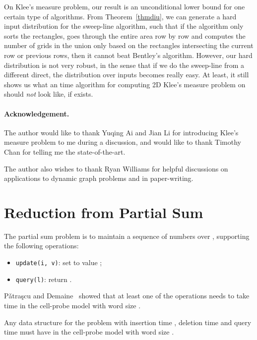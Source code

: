\documentclass[11pt]{article}
\begin{document}
On Klee's measure problem, our result is an unconditional lower bound for one certain type of algorithms. From Theorem~\ref{thmdiu}, we can generate a hard input distribution for the sweep-line algorithm, such that if the algorithm only sorts the rectangles, goes through the entire area row by row and computes the number of grids in the union only based on the rectangles intersecting the current row or previous rows, then it cannot beat Bentley's algorithm. However, our hard distribution is not very robust, in the sense that if we do the sweep-line from a different direct, the distribution over inputs becomes really easy. At least, it still shows us what an  time algorithm for computing 2D Klee's measure problem on  should \emph{not} look like, if exists. 

\paragraph*{Acknowledgement.}
The author would like to thank Yuqing Ai and Jian Li for introducing Klee's measure problem to me during a discussion, and would like to thank Timothy Chan for telling me the state-of-the-art.

 The author also wishes to thank Ryan Williams for helpful discussions on applications to dynamic graph problems and in paper-writing. 





\appendix

\section{Reduction from Partial Sum}\label{sectredps}
The partial sum problem is to maintain a sequence of  numbers  over , supporting the following operations:
\begin{itemize}
	\item
		\verb+update(i, v)+: set  to value ;
	\item
		\verb+query(l)+: return .
\end{itemize}

P\v{a}tra\c{s}cu and Demaine~\cite{PD04a} showed that at least one of the operations needs to take  time in the cell-probe model with word size . 

\begin{proposition}\label{redps}
Any data structure for the \diu{} problem with insertion time , deletion time  and query time  must have  in the cell-probe model with word size . 
\end{proposition}
\end{document}
